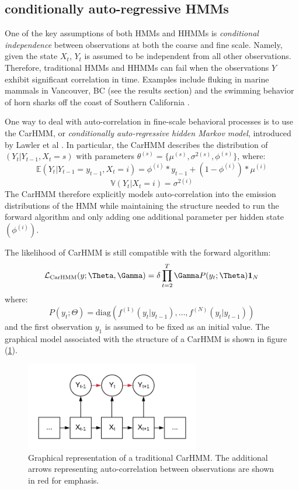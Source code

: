 \subsection{conditionally auto-regressive HMMs}

One of the key assumptions of both HMMs and HHMMs is \textit{conditional independence} between observations at both the coarse and fine scale. Namely, given the state $X_t$, $Y_t$ is assumed to be independent from all other observations. Therefore, traditional HMMs and HHMMs can fail when the observations $Y$ exhibit significant correlation in time. Examples include fluking in marine mammals in Vancouver, BC (see the results section) and the swimming behavior of horn sharks off the coast of Southern California \cite{Adam:2019}.

One way to deal with auto-correlation in fine-scale behavioral processes is to use the CarHMM, or \textit{conditionally auto-regressive hidden Markov model}, introduced by Lawler et al \cite{Lawler:2019}. In particular, the CarHMM describes the distribution of $(Y_t|Y_{t-1}, X_t=s)$ with parameters $\theta^{(s)} = \{\mu^{(s)},\sigma^{2(s)},\phi^{(s)}\}$, where:
%
$$\mathbb{E}(Y_t|Y_{t-1} = y_{t-1},X_t=i) = \phi^{(i)}*y_{t-1} + (1-\phi^{(i)}) * \mu^{(i)}$$
$$\mathbb{V}(Y_t| X_t = i) = \sigma^{2(i)}$$
%
The CarHMM therefore explicitly models auto-correlation into the emission distributions of the HMM while maintaining the structure needed to run the forward algorithm and only adding one additional parameter per hidden state $(\phi^{(i)})$. 

The likelihood of CarHMM is still compatible with the forward algorithm:
\begin{equation}
\calL_{\text{CarHMM}}(y;\Theta,\Gamma) = \delta \prod_{t=2}^T \Gamma P(y_t;\Theta) \mathbf{1}_N
\label{CarHMM_likelihood}
\end{equation}
where:
%
$$P(y_t;\Theta) = \text{diag}\left(f^{(1)}(y_t|y_{t-1}), \ldots , f^{(N)}(y_t|y_{t-1}) \right)$$
%
and the first observation $y_1$ is assumed to be fixed as an initial value. The graphical model associated with the structure of a CarHMM is shown in figure (\ref{fig:CarHMM}).

\begin{figure}[h!]
	\centering
	\includegraphics[width=3in]{../Plots/CarHMM.png}
	\caption{Graphical representation of a traditional CarHMM. The additional arrows representing auto-correlation between observations are shown in red for emphasis.}
	\label{fig:CarHMM}
\end{figure}


